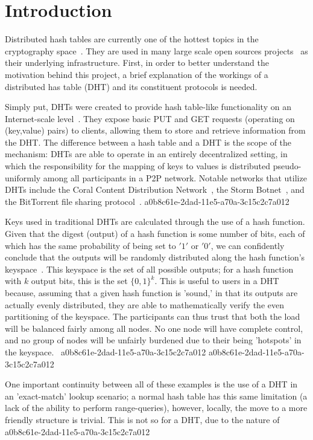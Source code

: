 \documentclass[12pt]{article}
\begin{document}
\section{Introduction}
\par Distributed hash tables are currently one of the hottest topics in the cryptography space~\cite{Stoica:2001dj,Rowstron:2001ea,Ratnasamy:2001wn}. They are used in many large scale open sources projects~\cite{Freitas:2013tb,Xu:2010vs,Perfitt:2010fh} as their underlying infrastructure. First, in order to better understand the motivation behind this project, a brief explanation of the workings of a distributed has table (DHT) and its constituent protocols is needed.

\par Simply put, DHTs were created to provide hash table-like functionality on an Internet-scale level~\cite{Ratnasamy:2001wn}. They expose basic PUT and GET requests (operating on (key,value) pairs) to clients, allowing them to store and retrieve information from the DHT. The difference between a hash table and a DHT is the scope of the mechanism: DHTs are able to operate in an entirely decentralized setting, in which the responsibility for the mapping of keys to values is distributed pseudo-uniformly among all participants in a P2P network. Notable networks that utilize DHTs include the Coral Content Distribution Network~\cite{Freedman:2004vb}, the Storm Botnet~\cite{Holz:2008uk}, and the BitTorrent file sharing protocol~\cite{Cohen:y1_8mBnw}.
a0b8c61e-2dad-11e5-a70a-3c15c2c7a012
\par Keys used in traditional DHTs are calculated through the use of a hash function. Given that the digest (output) of a hash function is some number of bits, each of which has the same probability of being set to $'1'$ or $'0'$, we can confidently conclude that the outputs will be randomly distributed along the hash function's keyspace~. This keyspace is the set of all possible outputs; for a hash function with $k$ output bits, this is the set $\{0,1\}^k$. This is useful to users in a DHT because, assuming that a given hash function is 'sound,' in that its outputs are actually evenly distributed, they are able to mathematically verify the even partitioning of the keyspace. The participants can thus trust that both the load will be balanced fairly among all nodes. No one node will have complete control, and no group of nodes will be unfairly burdened due to their being 'hotspots' in the keyspace.~
a0b8c61e-2dad-11e5-a70a-3c15c2c7a012
a0b8c61e-2dad-11e5-a70a-3c15c2c7a012\par One important continuity between all of these examples is the use of a DHT in an 'exact-match' lookup scenario; a normal hash table has this same limitation (a lack of the ability to perform range-queries), however, locally, the move to a more friendly structure is trivial. This is not so for a DHT, due to the nature of
\printbibliography
a0b8c61e-2dad-11e5-a70a-3c15c2c7a012
\end{document}
